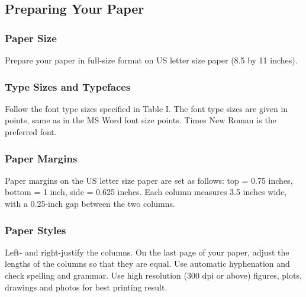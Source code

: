 \documentclass[conference,letterpaper]{IEEEtran}
\begin{document}
\subsection{Preparing Your Paper}
\subsubsection{Paper Size}

Prepare your paper in full-size format on US letter size paper 
(8.5 by 11 inches).

\subsubsection{Type Sizes and Typefaces}

Follow the font type sizes specified in Table I. The font type sizes are 
given in points, same as in the MS Word font size points. Times New Roman 
is the preferred font.

\subsubsection{Paper Margins}

Paper margins on the US letter size paper are set as follows: 
top = 0.75 inches, bottom = 1 inch, side = 0.625 inches. 
Each column measures 3.5 inches wide, with a 0.25-inch gap 
between the two columns.

\subsubsection{Paper Styles}

Left- and right-justify the columns.  On the last page of your paper, 
adjust the lengths of the columns so that they are equal.  Use automatic 
hyphenation and check spelling and grammar. Use high resolution 
(300 dpi or above) figures, plots, drawings and photos for best 
printing result.

\end{document}
